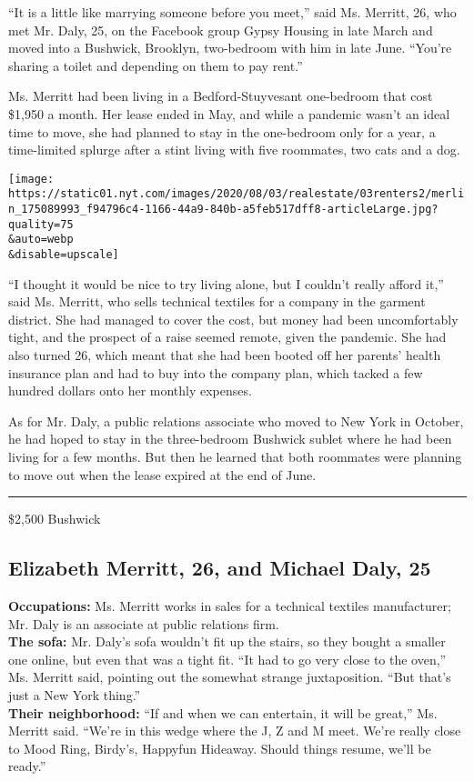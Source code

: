 ``It is a little like marrying someone before you meet,'' said Ms.
Merritt, 26, who met Mr. Daly, 25, on the Facebook group Gypsy Housing
in late March and moved into a Bushwick, Brooklyn, two-bedroom with him
in late June. ``You're sharing a toilet and depending on them to pay
rent.''

Ms. Merritt had been living in a Bedford-Stuyvesant one-bedroom that
cost \$1,950 a month. Her lease ended in May, and while a pandemic
wasn't an ideal time to move, she had planned to stay in the one-bedroom
only for a year, a time-limited splurge after a stint living with five
roommates, two cats and a dog.

\texttt{[image: https://static01.nyt.com/images/2020/08/03/realestate/03renters2/merlin\_175089993\_f94796c4-1166-44a9-840b-a5feb517dff8-articleLarge.jpg?quality=75\\\&auto=webp\\\&disable=upscale]}

``I thought it would be nice to try living alone, but I couldn't really
afford it,'' said Ms. Merritt, who sells technical textiles for a
company in the garment district. She had managed to cover the cost, but
money had been uncomfortably tight, and the prospect of a raise seemed
remote, given the pandemic. She had also turned 26, which meant that she
had been booted off her parents' health insurance plan and had to buy
into the company plan, which tacked a few hundred dollars onto her
monthly expenses.

As for Mr. Daly, a public relations associate who moved to New York in
October, he had hoped to stay in the three-bedroom Bushwick sublet where
he had been living for a few months. But then he learned that both
roommates were planning to move out when the lease expired at the end of
June.

\begin{center}\rule{0.5\linewidth}{\linethickness}\end{center}

\$2,500 \textbar{} Bushwick

\hypertarget{elizabeth-merritt-26-and-michael-daly-25}{%
\subsection{Elizabeth Merritt, 26, and Michael Daly,
25}\label{elizabeth-merritt-26-and-michael-daly-25}}

\textbf{Occupations:} Ms. Merritt works in sales for a technical
textiles manufacturer; Mr. Daly is an associate at public relations
firm.\\
\textbf{The sofa:} Mr. Daly's sofa wouldn't fit up the stairs, so they
bought a smaller one online, but even that was a tight fit. ``It had to
go very close to the oven,'' Ms. Merritt said, pointing out the somewhat
strange juxtaposition. ``But that's just a New York thing.''\\
\textbf{Their neighborhood:} ``If and when we can entertain, it will be
great,'' Ms. Merritt said. ``We're in this wedge where the J, Z and M
meet. We're really close to Mood Ring, Birdy's, Happyfun Hideaway.
Should things resume, we'll be ready.''

